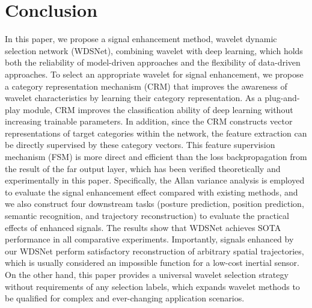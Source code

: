 \documentclass[letterpaper]{article} %
\begin{document}
	
	\section{Conclusion}
	In this paper, we propose a signal enhancement method, wavelet dynamic selection network (WDSNet), combining wavelet with deep learning, which holds both the reliability of model-driven approaches and the flexibility of data-driven approaches.
	To select an appropriate wavelet for signal enhancement, we propose a category representation mechanism (CRM) that improves the awareness of wavelet characteristics by learning their category representation. As a plug-and-play module, CRM improves the classification ability of deep learning without increasing trainable parameters.
	In addition, since the CRM constructs vector representations of target categories within the network, the feature extraction can be directly supervised by these category vectors. This feature supervision mechanism (FSM) is more direct and efficient than the loss backpropagation from the result of the far output layer, which has been verified theoretically and experimentally in this paper.
	Specifically, the Allan variance analysis is employed to evaluate the signal enhancement effect compared with existing methods, and we also construct four downstream tasks (posture prediction, position prediction, semantic recognition, and trajectory reconstruction) to evaluate the practical effects of enhanced signals. The results show that WDSNet achieves SOTA performance in all comparative experiments. Importantly, signals enhanced by our WDSNet perform satisfactory reconstruction of arbitrary spatial trajectories, which is usually considered an impossible function for a low-cost inertial sensor.
	On the other hand, this paper provides a universal wavelet selection strategy without requirements of any selection labels, which expands wavelet methods to be qualified for complex and ever-changing application scenarios.
	
	\appendix
	
	
	
	
\end{document}
